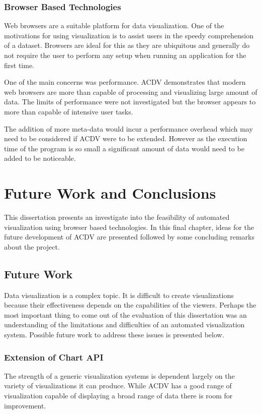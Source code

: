 \documentclass[a4paper, 11pt, titlepage, onehalfspacing]{report}
\begin{document}
\subsection{Browser Based Technologies}
Web browsers are a suitable platform for data visualization. One of the motivations for using visualization is to assist users in the speedy comprehension of a dataset. Browsers are ideal for this as they are ubiquitous and generally do not require the user to perform any setup when running an application for the first time.

One of the main concerns was performance. AC\lightning{}DV demonstrates that modern web browsers are more than capable of processing and visualizing large amount of data. The limits of performance were not investigated but the browser appears to more than capable of intensive user tasks.

The addition of more meta-data would incur a performance overhead which may need to be considered if AC\lightning{}DV were to be extended. However as the execution time of the program is so small a significant amount of data would need to be added to be noticeable.




\chapter{Future Work and Conclusions}
\label{future}
This dissertation presents an investigate into the feasibility of automated visualization using browser based technologies. In this final chapter, ideas for the future development of AC\lightning{}DV are presented followed by some concluding remarks about the project.

\section{Future Work}
Data visualization is a complex topic. It is difficult to create visualizations because their effectiveness depends on the capabilities of the viewers. Perhaps the most important thing to come out of the evaluation of this dissertation was an understanding of the limitations and difficulties of an automated visualization system. Possible future work to address these issues is presented below.

\subsection{Extension of Chart API}
The strength of a generic visualization systems is dependent largely on the variety of visualizations it can produce. While AC\lightning{}DV has a good range of visualization capable of displaying a broad range of data there is room for improvement. 
\end{document}
